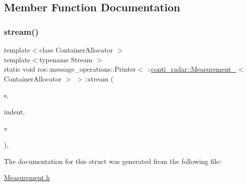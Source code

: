 \subsection{Member Function Documentation}
\mbox{\label{structros_1_1message__operations_1_1Printer_3_01_1_1conti__radar_1_1Measurement___3_01ContainerAllocator_01_4_01_4_ab4aa2261b5a296f3e37c3449218c8dde}} 
\subsubsection{\texorpdfstring{stream()}{stream()}}
{\footnotesize\ttfamily template$<$class Container\+Allocator $>$ \\
template$<$typename Stream $>$ \\
static void ros\+::message\+\_\+operations\+::\+Printer$<$ \+::\hyperlink{structconti__radar_1_1Measurement__}{conti\+\_\+radar\+::\+Measurement\+\_\+}$<$ Container\+Allocator $>$ $>$\+::stream (\begin{DoxyParamCaption}\item[{Stream \&}]{s,  }\item[{const std\+::string \&}]{indent,  }\item[{const \+::\hyperlink{structconti__radar_1_1Measurement__}{conti\+\_\+radar\+::\+Measurement\+\_\+}$<$ Container\+Allocator $>$ \&}]{v }\end{DoxyParamCaption})\hspace{0.3cm}{\ttfamily [inline]}, {\ttfamily [static]}}



The documentation for this struct was generated from the following file\+:\begin{DoxyCompactItemize}
\item 
\hyperlink{Measurement_8h}{Measurement.\+h}\end{DoxyCompactItemize}
